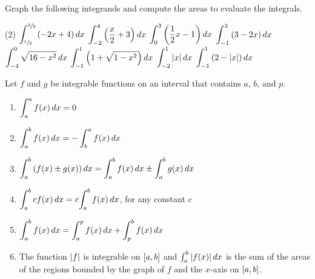 \documentclass[../mathNotesPreamble]{subfiles}
\begin{document}
\begin{ex*}
  Graph the following integrands and compute the areas to evaluate the integrals.
\end{ex*}
\begin{tasks}[after-item-skip=\stretch{1}](2)
  \task $\displaystyle\int_{\sfrac{1}{2}}^{\sfrac{3}{2}} {\left(-2x+4\right)}\,dx$
  \task $\displaystyle\int_{-2}^{4} {\left(\frac{x}{2}+3\right)}\,dx$
  \task $\displaystyle\int_{0}^{3} {\left(\frac{1}{2}x-1\right)}\,dx$
  \task $\displaystyle\int_{-1}^{3} {\left(3-2x\right)}\,dx$
  \task $\displaystyle\int_{-4}^{0} \sqrt{16-x^2}\,dx$
  \task $\displaystyle\int_{-1}^{1} {\left(1+\sqrt{1-x^2}\right)}\,dx$
  \task $\displaystyle\int_{-2}^{1} {\left\vert x\right\vert}\,dx$
  \task $\displaystyle\int_{-1}^{1} {\left(2-{\left\vert x\right\vert}\right)}\,dx$
\end{tasks}

\pagebreak

\begin{thmBox*}
  Let $f$ and $g$ be integrable functions on an interval that contains $a$, $b$, and $p$.
  
  \begin{enumerate}
    \item $\displaystyle\int_a^a f(x)\,dx=0$
    \item $\displaystyle\int_a^b f(x)\,dx=-\int_b^a f(x)\,dx$
    \item $\displaystyle\int_a^b {\left(f(x)\pm g(x)\right)}\,dx=\int_a^b f(x)\,dx\pm \int_a^b g(x)\,dx$
    \item $\displaystyle\int_a^b c\,\!f(x)\,dx=c\!\int_a^b f(x)\,dx$, for any constant $c$
    \item $\displaystyle\int_a^b f(x)\,dx=\int_a^p f(x)\,dx+\int_p^b f(x)\,dx$
    \item The function ${\left\vert f\right\vert}$ is integrable on ${\left[a,b\right]}$ and $\int_a^b{\left\vert f(x)\right\vert}\,dx$ is the sum of the areas of the regions bounded by the graph of $f$ and the $x$-axis on ${\left[a,b\right]}$.
    \vspace*{-0.5\baselineskip}
  \end{enumerate}
\end{thmBox*}
\end{document}
